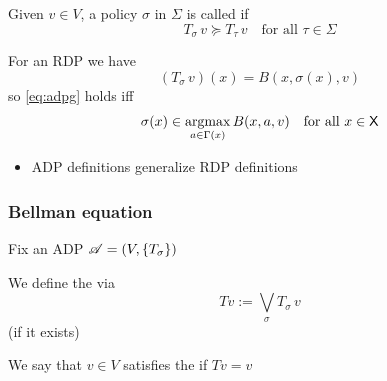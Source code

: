 \documentclass[dvipsnames]{beamer}
\begin{document}
\begin{frame}
    
    Given $v \in V$, a policy $\sigma$ in $\Sigma$ is called 
    if 
    \begin{equation}\label{eq:adpg}
        T_{\sigma} \, v \succeq T_\tau \, v
        \quad \text{for all } \tau \in \Sigma
    \end{equation}

            \vspace{0.5em}
            \vspace{0.5em}
    \Eg For an RDP we have
    \begin{equation*}
        (T_\sigma \, v)(x) 
            = B(x, \sigma(x), v)
    \end{equation*}
    so \eqref{eq:adpg} holds iff 
    \begin{equation*}
        \sigma(x) \in \argmax_{a \in \Gamma(x)} 
        B(x, a, v)
        \quad \text{for all } x \in \Xsf
    \end{equation*}


    \begin{itemize}
        \item ADP definitions generalize RDP definitions
    \end{itemize}

\end{frame}

\begin{frame}
    \frametitle{Bellman equation}
    
    Fix an ADP $\mathscr A = (V, \{T_\sigma\})$

            \vspace{0.5em}
            \vspace{0.5em}
            \vspace{0.5em}
    We define the   via
    \begin{equation*}
        T v := \bigvee_\sigma T_\sigma \, v 
    \end{equation*}
    (if it exists)


            \vspace{0.5em}
            \vspace{0.5em}
    We say that $v \in V$ satisfies the  if $T v=v$



\end{frame}
\end{document}
